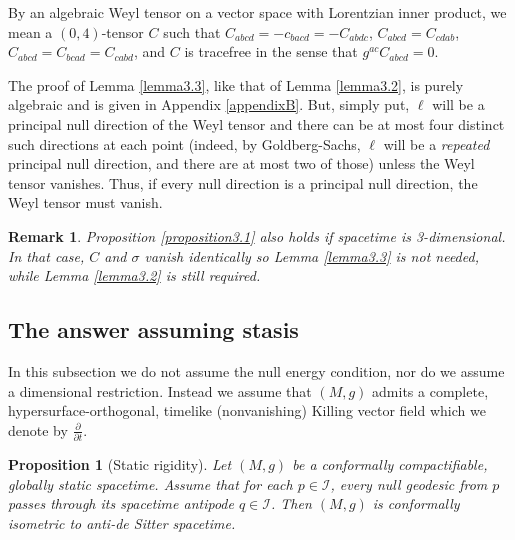 \documentclass[12pt]{amsart}
\numberwithin{equation}{section}
\newtheorem{proposition}[theorem]{Proposition}
\newtheorem{remark}[theorem]{Remark}
\begin{document}
By an algebraic Weyl tensor on a vector space with Lorentzian inner product, we mean a $(0,4)$-tensor $C$ such that $C_{abcd}=-c_{bacd}=-C_{abdc}$, $C_{abcd}=C_{cdab}$, $C_{abcd}=C_{bcad}=C_{cabd}$, and $C$ is tracefree in the sense that $g^{ac}C_{abcd}=0$.

The proof of Lemma \ref{lemma3.3}, like that of Lemma \ref{lemma3.2}, is purely algebraic and is given in Appendix \ref{appendixB}. But, simply put, $\ell$ will be a principal null direction of the Weyl tensor and there can be at most four distinct such directions at each point (indeed, by Goldberg-Sachs, $\ell$ will be a \emph{repeated} principal null direction, and there are at most two of those) unless the Weyl tensor vanishes. Thus, if every null direction is a principal null direction, the Weyl tensor must vanish.

\begin{remark}\label{remark3.4} Proposition \ref{proposition3.1} also holds if spacetime is 3-dimensional. In that case, $C$ and $\sigma$ vanish identically so Lemma \ref{lemma3.3} is not needed, while Lemma \ref{lemma3.2} is still required.
\end{remark}

\subsection{The answer assuming stasis}\label{subsection3.2}
In this subsection we do not assume the null energy condition, nor do we assume a dimensional restriction. Instead we assume that $(M,g)$ admits a complete, hypersurface-orthogonal, timelike (nonvanishing) Killing vector field which we denote by $\frac{\partial}{\partial t}$.

\begin{proposition}[Static rigidity]\label{proposition3.5}
Let $(M,g)$ be a conformally compactifiable, globally static spacetime. Assume that for each $p\in {\mathcal I}$, every null geodesic from $p$ passes through its spacetime antipode $q\in {\mathcal I}$. Then $(M,g)$ is conformally isometric to anti-de Sitter spacetime.
\end{proposition}
\end{document}
